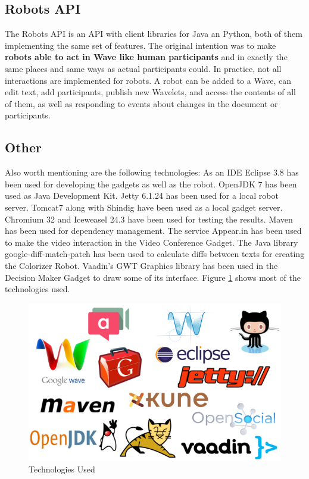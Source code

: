 \subsection{Robots API}
The Robots API \cite{ref:robots_api} is an API with client libraries for Java an Python, both of them implementing the same set of features. The original intention was to make \textbf{robots able to act in Wave like human participants} and in exactly the same places and same ways as actual participants could. In practice, not all interactions are implemented for robots. A robot can be added to a Wave, can edit text, add participants, publish new Wavelets, and access the contents of all of them, as well as responding to events about changes in the document or participants.

\subsection{Other}
Also worth mentioning are the following technologies:
As an IDE Eclipse \cite{ref:eclipse} 3.8 has been used for developing the gadgets as well as the robot. OpenJDK \cite{ref:openjdk} 7 has been used as Java Development Kit. Jetty \cite{ref:jetty} 6.1.24 has been used for a local robot server. Tomcat7 \cite{ref:tomcat} along with Shindig have been used as a local gadget server. Chromium \cite{ref:chromium} 32 and Iceweasel \cite{ref:iceweasel} 24.3 have been used for testing the results. Maven \cite{ref:maven} has been used for dependency management. The service Appear.in has been used to make the video interaction in the Video Conference Gadget. The Java library google-diff-match-patch has been used to calculate diffs between texts for creating the Colorizer Robot. Vaadin's GWT Graphics library has been used in the Decision Maker Gadget to draw some of its interface. Figure \ref{fig:logos} shows most of the technologies used.
\begin{figure}[h]
  \center
    \includegraphics[keepaspectratio, scale=0.45]{Media/logos.png}
  \caption{Technologies Used}
  \label{fig:logos}
\end{figure}

